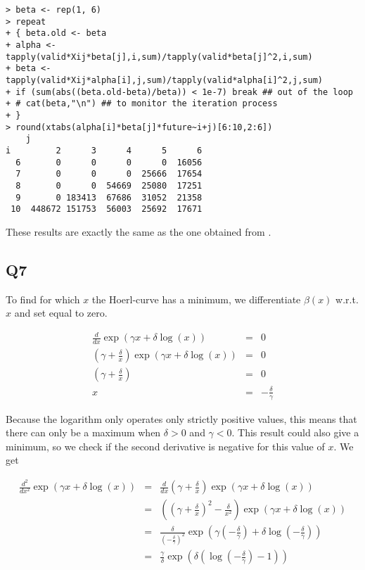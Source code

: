 \documentclass[11pt]{article}
\begin{document}
\begin{verbatim}
> beta <- rep(1, 6)
> repeat
+ { beta.old <- beta
+ alpha <- tapply(valid*Xij*beta[j],i,sum)/tapply(valid*beta[j]^2,i,sum)
+ beta <- tapply(valid*Xij*alpha[i],j,sum)/tapply(valid*alpha[i]^2,j,sum)
+ if (sum(abs((beta.old-beta)/beta)) < 1e-7) break ## out of the loop
+ # cat(beta,"\n") ## to monitor the iteration process
+ }
> round(xtabs(alpha[i]*beta[j]*future~i+j)[6:10,2:6])
    j
i         2      3      4      5      6
  6       0      0      0      0  16056
  7       0      0      0  25666  17654
  8       0      0  54669  25080  17251
  9       0 183413  67686  31052  21358
 10  448672 151753  56003  25692  17671
\end{verbatim}

These results are exactly the same as the one obtained from .

\subsection*{Q7}

To find for which $x$ the Hoerl-curve has a minimum, we differentiate $\beta(x)$ w.r.t. $x$ and set equal to zero.

\begin{eqnarray}
\frac{d}{dx} \exp(\gamma x + \delta \log(x)) &=& 0 \\
(\gamma + \frac{\delta}{x})\exp(\gamma x + \delta \log(x)) &=& 0 \\ 
(\gamma + \frac{\delta}{x}) &=& 0 \\
x &=& -\frac{\delta}{\gamma}
\end{eqnarray}

Because the logarithm only operates only strictly positive values, this means that there can only be a maximum when $\delta > 0$ and $\gamma < 0$. This result could also give a minimum, so we check if the second derivative is negative for this value of $x$. We get

\begin{eqnarray}
\frac{d^2}{dx^2} \exp(\gamma x + \delta \log(x)) &=& \frac{d}{dx} (\gamma + \frac{\delta}{x})\exp(\gamma x + \delta \log(x)) \\
&=& ((\gamma + \frac{\delta}{x})^{2} - \frac{\delta}{x^{2}}) \exp(\gamma x + \delta \log(x)) \\
&=& \frac{\delta}{(-\frac{\delta}{\gamma})^{2}} \exp(\gamma (-\frac{\delta}{\gamma}) + \delta \log(-\frac{\delta}{\gamma})) \\
&=& \frac{\gamma}{\delta} \exp(\delta( \log(-\frac{\delta}{\gamma})-1))
\end{eqnarray}
\end{document}
